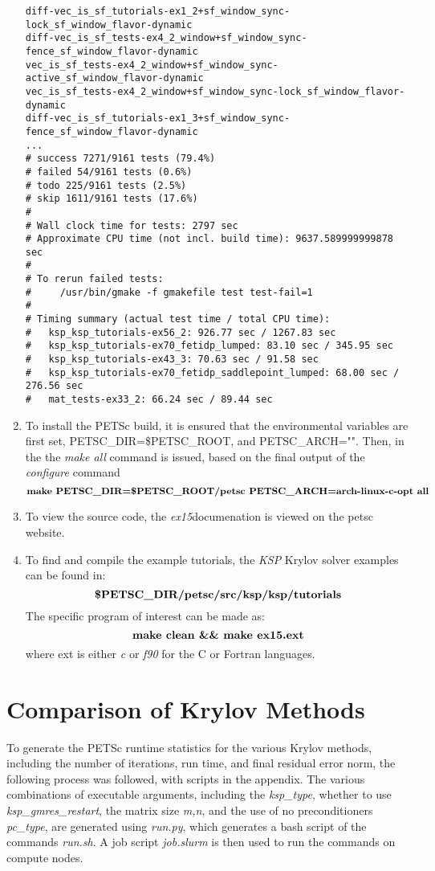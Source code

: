 \documentclass[12pt,letterpaper]{article}
\newcommand{\exe}{PETSc }
\newcommand{\cmd}[1]{$$\textrm{\textbf{#1}}$$}
\newcommand{\program}{\textit{ex15}}
\newcommand{\programreg}{ex15}
\begin{document}
\begin{enumerate}
\begin{verbatim}
diff-vec_is_sf_tutorials-ex1_2+sf_window_sync-lock_sf_window_flavor-dynamic 
diff-vec_is_sf_tests-ex4_2_window+sf_window_sync-fence_sf_window_flavor-dynamic
vec_is_sf_tests-ex4_2_window+sf_window_sync-active_sf_window_flavor-dynamic 
vec_is_sf_tests-ex4_2_window+sf_window_sync-lock_sf_window_flavor-dynamic 
diff-vec_is_sf_tutorials-ex1_3+sf_window_sync-fence_sf_window_flavor-dynamic 
... 
# success 7271/9161 tests (79.4%)
# failed 54/9161 tests (0.6%)
# todo 225/9161 tests (2.5%)
# skip 1611/9161 tests (17.6%)
#
# Wall clock time for tests: 2797 sec
# Approximate CPU time (not incl. build time): 9637.589999999878 sec
#
# To rerun failed tests: 
#     /usr/bin/gmake -f gmakefile test test-fail=1
#
# Timing summary (actual test time / total CPU time): 
#   ksp_ksp_tutorials-ex56_2: 926.77 sec / 1267.83 sec
#   ksp_ksp_tutorials-ex70_fetidp_lumped: 83.10 sec / 345.95 sec
#   ksp_ksp_tutorials-ex43_3: 70.63 sec / 91.58 sec
#   ksp_ksp_tutorials-ex70_fetidp_saddlepoint_lumped: 68.00 sec / 276.56 sec
#   mat_tests-ex33_2: 66.24 sec / 89.44 sec
\end{verbatim}
  \item To install the \exe build, it is ensured that the environmental variables are first set, PETSC\_DIR=\$PETSC\_ROOT, and PETSC\_ARCH="". Then, in the the \textit{make all} command is issued, based on the final output of the \textit{configure} command
  \cmd{make PETSC\_DIR=\$PETSC\_ROOT/petsc PETSC\_ARCH=arch-linux-c-opt all}
  \item To view the source code, the \program documenation is viewed on the petsc website.
  \item To find and compile the example tutorials, the \textit{KSP} Krylov solver examples can be found in:
  \cmd{\$PETSC\_DIR/petsc/src/ksp/ksp/tutorials}
  The specific program of interest can be made as:
  \cmd{make clean \&\& make \programreg.ext}
  where ext is either \textit{c} or \textit{f90} for the C or Fortran languages.
\end{enumerate}


\section{Comparison of Krylov Methods}
To generate the \exe runtime statistics for the various Krylov methods, including the number of iterations, run time, and final residual error norm, the following process was followed, with scripts in the appendix.  The various combinations of executable arguments, including the \textit{ksp\_type}, whether to use \textit{ksp\_gmres_restart}, the matrix size \textit{m,n}, and the use of no preconditioners \textit{pc\_type}, are generated using \textit{run.py}, which generates a bash script of the commands \textit{run.sh}. A job script \textit{job.slurm} is then used to run the commands on compute nodes. 
\end{document}

